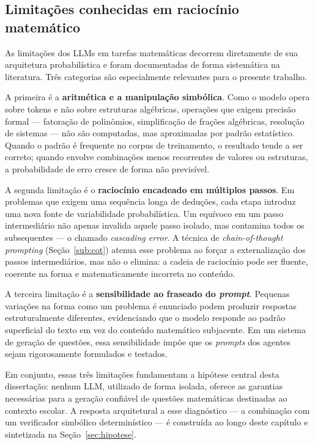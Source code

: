 \subsection{Limitações conhecidas em raciocínio matemático}
\label{sec:limitacoes}

As limitações dos LLMs em tarefas matemáticas decorrem diretamente de sua arquitetura probabilística
e foram documentadas de forma sistemática na literatura. Três categorias são especialmente
relevantes para o presente trabalho.

A primeira é a \textbf{aritmética e a manipulação simbólica}. Como o modelo opera sobre tokens e não
sobre estruturas algébricas, operações que exigem precisão formal --- fatoração de polinômios,
simplificação de frações algébricas, resolução de sistemas --- não são computadas, mas aproximadas
por padrão estatístico. Quando o padrão é frequente no corpus de treinamento, o resultado tende a
ser correto; quando envolve combinações menos recorrentes de valores ou estruturas, a probabilidade
de erro cresce de forma não previsível.

A segunda limitação é o \textbf{raciocínio encadeado em múltiplos passos}. Em problemas que exigem
uma sequência longa de deduções, cada etapa introduz uma nova fonte de variabilidade probabilística.
Um equívoco em um passo intermediário não apenas invalida aquele passo isolado, mas contamina todos
os subsequentes --- o chamado \emph{cascading error}. A técnica de \emph{chain-of-thought prompting}
(Seção~\ref{sub:cot}) atenua esse problema ao forçar a externalização dos passos intermediários, mas
não o elimina: a cadeia de raciocínio pode ser fluente, coerente na forma e matematicamente
incorreta no conteúdo.

A terceira limitação é a \textbf{sensibilidade ao fraseado do \emph{prompt}}. Pequenas variações na
forma como um problema é enunciado podem produzir respostas estruturalmente diferentes, evidenciando
que o modelo responde ao padrão superficial do texto em vez do conteúdo matemático subjacente. Em um
sistema de geração de questões, essa sensibilidade impõe que os \emph{prompts} dos agentes sejam
rigorosamente formulados e testados.

Em conjunto, essas três limitações fundamentam a hipótese central desta dissertação: nenhum LLM,
utilizado de forma isolada, oferece as garantias necessárias para a geração confiável de questões
matemáticas destinadas ao contexto escolar. A resposta arquitetural a esse diagnóstico --- a
combinação com um verificador simbólico determinístico --- é construída ao longo deste capítulo e
sintetizada na Seção~\ref{sec:hipotese}.

